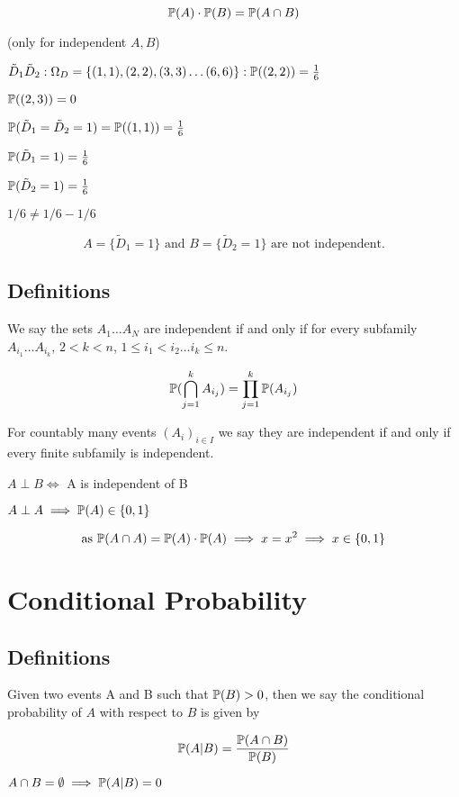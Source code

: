 $$
\mathbb{P}(A)\cdot\mathbb{P}(B)=\mathbb{P}(A\cap B)
$$

(only for independent $A,B$)

$
\tilde{D}_1
\tilde{D}_2
:
\Omega_D=\{(1,1),(2,2),(3,3)\dots(6,6)\}
:
\mathbb{P}((2,2))=\frac{1}{6}
$

$
\mathbb{P}((2,3))=0
$

$
\mathbb{P}(\tilde{D}_1=\tilde{D}_2=1)=\mathbb{P}((1,1))=\frac{1}{6}
$

$
\mathbb{P}(\tilde{D}_1=1)=\frac{1}{6}
$

$
\mathbb{P}(\tilde{D}_2=1)=\frac{1}{6}
$

$
1/6 \neq 1/6-1/6
$

$$
A=\{  \tilde{D}_1=1\} \text{ and } B=\{ \tilde{D}_2=1 \} \text{ are not independent.}
$$

\subsection{Definitions}

We say the sets $A_1\dots A_N$ are independent if and only if for every subfamily $A_{i_1}\dots A_{i_k}$, $2<k<n$, $1\leq i_{1}<i_2\dots i_k\leq n$.

$$
\mathbb{P}( \bigcap_{j=1}^{k} A_{i_j} )=\prod_{j=1}^{k} \mathbb{P}(A_{i_j})
$$

For countably many events $(A_i)_{i\in I}$ we say they are independent if and only if every finite subfamily is independent.

$A\perp B\iff $ A is independent of B

$A\perp A \implies \mathbb{P}(A)\in\{0,1\}$

$$\text{as }
\mathbb{P}(A\cap A)=\mathbb{P}(A)\cdot\mathbb{P}(A)\implies x=x^2\implies x \in \{0,1\}
$$






\section{Conditional Probability}

\subsection{Definitions}

Given two events A and B such that $\mathbb{P}(B)>0$, then we say the conditional probability of $A$ with respect to $B$ is given by

$$
\mathbb{P}(A|B)=\frac{\mathbb{P}(A\cap B)}{\mathbb{P}(B)}
$$

$A\cap B=\emptyset\implies \mathbb{P}(A|B)=0$

